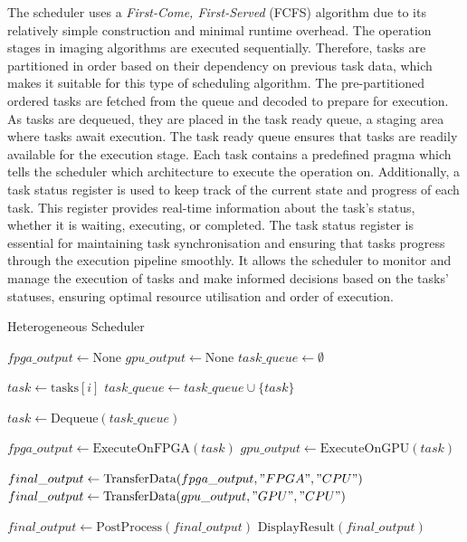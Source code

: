 The scheduler uses a \textit{First-Come, First-Served} (FCFS) algorithm due to its relatively simple construction and minimal runtime overhead. The operation stages in imaging algorithms are executed sequentially. Therefore, tasks are partitioned in order based on their dependency on previous task data, which makes it suitable for this type of scheduling algorithm. The pre-partitioned ordered tasks are fetched from the queue and decoded to prepare for execution. As tasks are dequeued, they are placed in the task ready queue, a staging area where tasks await execution. The task ready queue ensures that tasks are readily available for the execution stage. Each task contains a predefined pragma which tells the scheduler which architecture to execute the operation on. Additionally, a task status register is used to keep track of the current state and progress of each task. This register provides real-time information about the task's status, whether it is waiting, executing, or completed. The task status register is essential for maintaining task synchronisation and ensuring that tasks progress through the execution pipeline smoothly. It allows the scheduler to monitor and manage the execution of tasks and make informed decisions based on the tasks' statuses, ensuring optimal resource utilisation and order of execution.


\begin{algorithm}[tb]
\caption{Heterogeneous Scheduler}
\label{Alg:HeterogeneousScheduler}
\begin{algorithmic}[1]
    \State $fpga\_output \gets \text{None}$
    \State $gpu\_output \gets \text{None}$
    \State $task\_queue \gets \emptyset$  
    
        \State $task \gets \text{tasks}[i]$
        \State $task\_queue \gets task\_queue \cup \{task\}$  
    \EndFor

        \State $task \gets \text{Dequeue}(task\_queue)$  
        
            \State $fpga\_output \gets \text{ExecuteOnFPGA}(task)$
            \State $gpu\_output \gets \text{ExecuteOnGPU}(task)$
        \EndIf
    \EndWhile
    
        \State $final\_output \gets \text{TransferData}(fpga\_output, "FPGA", "CPU")$
    \Else
        \State $final\_output \gets \text{TransferData}(gpu\_output, "GPU", "CPU")$
    \EndIf
    
    \State $final\_output \gets \text{PostProcess}(final\_output)$
    \State $\text{DisplayResult}(final\_output)$
\end{algorithmic}
\end{algorithm}



